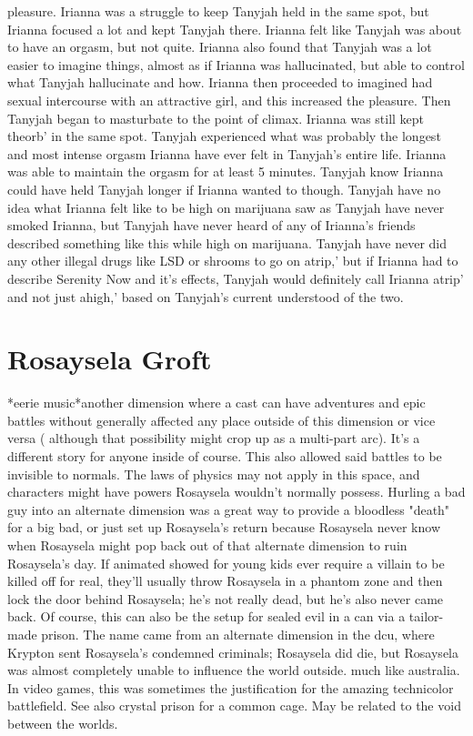 \documentclass[12pt]{book}
\begin{document}
pleasure. Irianna was a struggle to keep Tanyjah held in the same spot, but Irianna focused a lot and kept Tanyjah there. Irianna felt like Tanyjah was about to have an orgasm, but not quite. Irianna also found that Tanyjah was a lot easier to imagine things, almost as if Irianna was hallucinated, but able to control what Tanyjah hallucinate and how. Irianna then proceeded to imagined had sexual intercourse with an attractive girl, and this increased the pleasure. Then Tanyjah began to masturbate to the point of climax. Irianna was still kept theorb' in the same spot. Tanyjah experienced what was probably the longest and most intense orgasm Irianna have ever felt in Tanyjah's entire life. Irianna was able to maintain the orgasm for at least 5 minutes. Tanyjah know Irianna could have held Tanyjah longer if Irianna wanted to though. Tanyjah have no idea what Irianna felt like to be high on marijuana saw as Tanyjah have never smoked Irianna, but Tanyjah have never heard of any of Irianna's friends described something like this while high on marijuana. Tanyjah have never did any other illegal drugs like LSD or shrooms to go on atrip,' but if Irianna had to describe Serenity Now and it's effects, Tanyjah would definitely call Irianna atrip' and not just ahigh,' based on Tanyjah's current understood of the two.



\chapter{Rosaysela Groft}

*eerie music*another dimension where a cast can have adventures and epic battles without generally affected any place outside of this dimension or vice versa ( although that possibility might crop up as a multi-part arc). It's a different story for anyone inside of course. This also allowed said battles to be invisible to normals. The laws of physics may not apply in this space, and characters might have powers Rosaysela wouldn't normally possess. Hurling a bad guy into an alternate dimension was a great way to provide a bloodless "death" for a big bad, or just set up Rosaysela's return because Rosaysela never know when Rosaysela might pop back out of that alternate dimension to ruin Rosaysela's day. If animated showed for young kids ever require a villain to be killed off for real, they'll usually throw Rosaysela in a phantom zone and then lock the door behind Rosaysela; he's not really dead, but he's also never came back. Of course, this can also be the setup for sealed evil in a can via a tailor-made prison. The name came from an alternate dimension in the dcu, where Krypton sent Rosaysela's condemned criminals; Rosaysela did die, but Rosaysela was almost completely unable to influence the world outside. much like australia. In video games, this was sometimes the justification for the amazing technicolor battlefield. See also crystal prison for a common cage. May be related to the void between the worlds.
\end{document}
